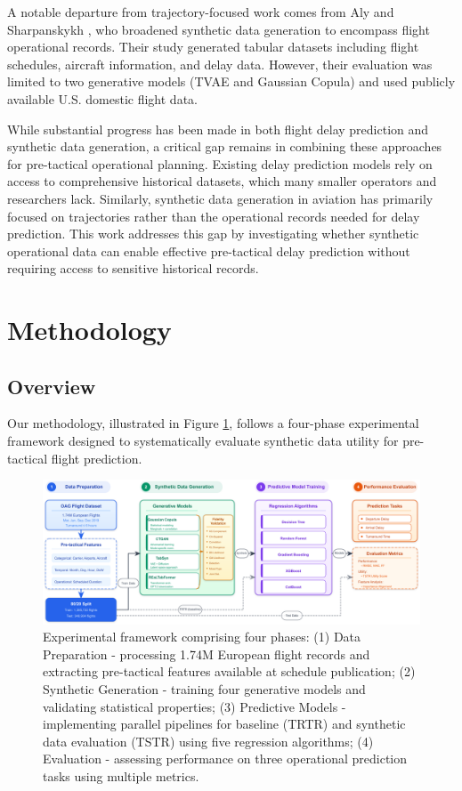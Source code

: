 \documentclass[conference]{IEEEtran}
\begin{document}
A notable departure from trajectory-focused work comes from Aly and Sharpanskykh \cite{aly2025synthetic}, who broadened synthetic data generation to encompass flight operational records. Their study generated tabular datasets including flight schedules, aircraft information, and delay data. However, their evaluation was limited to two generative models (TVAE and Gaussian Copula) and used publicly available U.S. domestic flight data.


While substantial progress has been made in both flight delay prediction and synthetic data generation, a critical gap remains in combining these approaches for pre-tactical operational planning. Existing delay prediction models rely on access to comprehensive historical datasets, which many smaller operators and researchers lack. Similarly, synthetic data generation in aviation has primarily focused on trajectories rather than the operational records needed for delay prediction. This work addresses this gap by investigating whether synthetic operational data can enable effective pre-tactical delay prediction without requiring access to sensitive historical records.



\section{Methodology}

\subsection{Overview} 
Our methodology, illustrated in Figure \ref{fig:framework}, follows a four-phase experimental framework designed to systematically evaluate synthetic data utility for pre-tactical flight prediction. 


\begin{figure}[t]
    \centering
    \includegraphics[width=\textwidth]{diagrams/overall_framework.pdf}
    \caption{Experimental framework comprising four phases: (1) Data Preparation - processing 1.74M European flight records and extracting pre-tactical features available at schedule publication; (2) Synthetic Generation - training four generative models and validating statistical properties; (3) Predictive Models - implementing parallel pipelines for baseline (TRTR) and synthetic data evaluation (TSTR) using five regression algorithms; (4) Evaluation - assessing performance on three operational prediction tasks using multiple metrics.}
    \label{fig:framework}
\end{figure}
\end{document}
